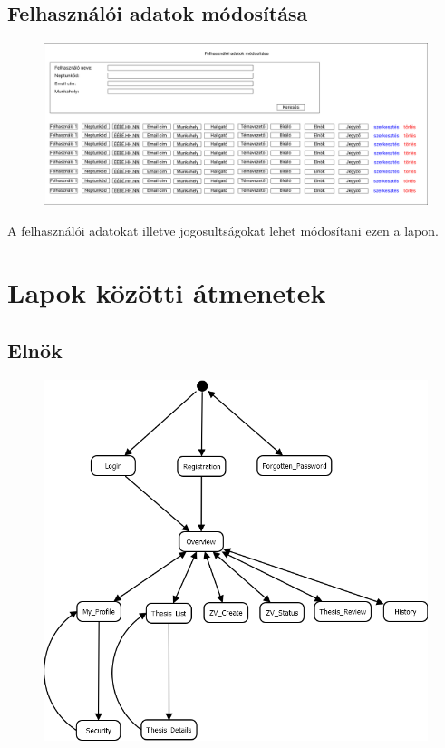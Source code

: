 \documentclass[a4paper,12pt]{article}
\begin{document}
\subsection{Felhasználói adatok módosítása}

\begin{figure}
	\centering
	\includegraphics[width=\textwidth]{images/Web_pages/User_Modifiactions.png}
	\caption{}
	\label{fig:User_Modifiactions}
\end{figure}

A felhasználói adatokat illetve jogosultságokat lehet módosítani ezen a lapon.

\section{Lapok közötti átmenetek}

\subsection{Elnök}

\begin{figure}
	\centering
	\includegraphics[width=\textwidth]{images/Lapok_kozotti_atmenetek/Elnok.png}
	\caption{}
	\label{fig:Elnok}
\end{figure}
\end{document}
